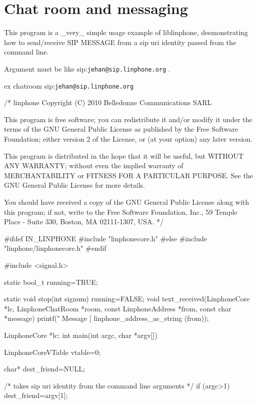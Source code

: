 \section{\-Chat room and messaging}
\label{group__chatroom__tuto}
\-This program is a \-\_\-very\-\_\- simple usage example of liblinphone, desmonstrating how to send/receive \-S\-I\-P \-M\-E\-S\-S\-A\-G\-E from a sip uri identity passed from the command line. \par
\-Argument must be like sip\-:{\tt jehan@sip.\-linphone.\-org} . \par
 ex chatroom sip\-:{\tt jehan@sip.\-linphone.\-org} \par
 
\begin{DoxyCodeInclude}

/*
linphone
Copyright (C) 2010  Belledonne Communications SARL 

This program is free software; you can redistribute it and/or
modify it under the terms of the GNU General Public License
as published by the Free Software Foundation; either version 2
of the License, or (at your option) any later version.

This program is distributed in the hope that it will be useful,
but WITHOUT ANY WARRANTY; without even the implied warranty of
MERCHANTABILITY or FITNESS FOR A PARTICULAR PURPOSE.  See the
GNU General Public License for more details.

You should have received a copy of the GNU General Public License
along with this program; if not, write to the Free Software
Foundation, Inc., 59 Temple Place - Suite 330, Boston, MA  02111-1307, USA.
*/

#ifdef IN_LINPHONE
#include "linphonecore.h"
#else
#include "linphone/linphonecore.h"
#endif

#include <signal.h>

static bool_t running=TRUE;

static void stop(int signum){
        running=FALSE;
}
void text_received(LinphoneCore *lc, LinphoneChatRoom *room, const 
      LinphoneAddress *from, const char *message) {
        printf(" Message [%
      linphone_address_as_string (from));
}


LinphoneCore *lc;
int main(int argc, char *argv[]){
        LinphoneCoreVTable vtable={0};

        char* dest_friend=NULL;


        /* takes   sip uri  identity from the command line arguments */
        if (argc>1){
                dest_friend=argv[1];
        }

}
\end{DoxyCodeInclude}
